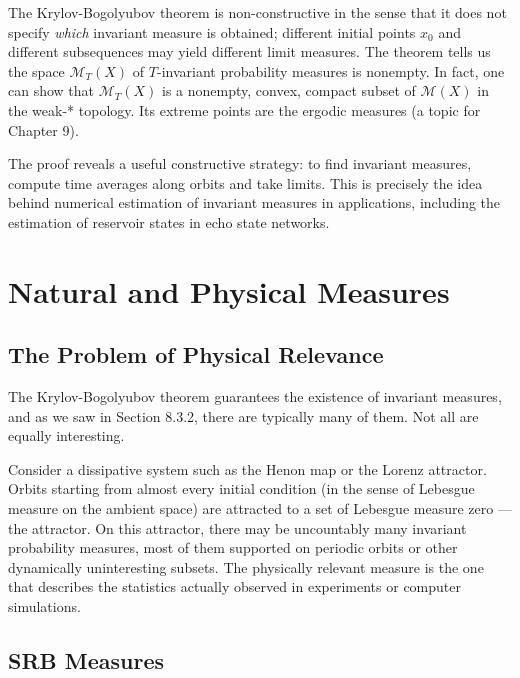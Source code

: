 \begin{remark}
The Krylov-Bogolyubov theorem is non-constructive in the sense that it does not specify \textit{which} invariant measure is obtained; different initial points $x_0$ and different subsequences may yield different limit measures. The theorem tells us the space $\mathcal{M}_T(X)$ of $T$-invariant probability measures is nonempty. In fact, one can show that $\mathcal{M}_T(X)$ is a nonempty, convex, compact subset of $\mathcal{M}(X)$ in the weak-* topology. Its extreme points are the ergodic measures (a topic for Chapter 9).
\end{remark}


\begin{remark}
The proof reveals a useful constructive strategy: to find invariant measures, compute time averages along orbits and take limits. This is precisely the idea behind numerical estimation of invariant measures in applications, including the estimation of reservoir states in echo state networks.


\bigskip

\end{remark}


\section{Natural and Physical Measures}\label{sec:8.4}

\subsection{The Problem of Physical Relevance}\label{sec:8.4.1}

The Krylov-Bogolyubov theorem guarantees the existence of invariant measures, and as we saw in Section 8.3.2, there are typically many of them. Not all are equally interesting.

Consider a dissipative system such as the Henon map or the Lorenz attractor. Orbits starting from almost every initial condition (in the sense of Lebesgue measure on the ambient space) are attracted to a set of Lebesgue measure zero --- the attractor. On this attractor, there may be uncountably many invariant probability measures, most of them supported on periodic orbits or other dynamically uninteresting subsets. The physically relevant measure is the one that describes the statistics actually observed in experiments or computer simulations.

\subsection{SRB Measures}\label{sec:8.4.2}

